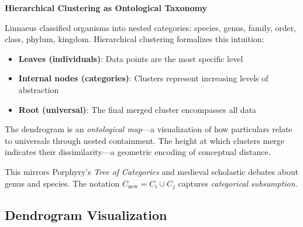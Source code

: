 \begin{philobox}
\textbf{Hierarchical Clustering as Ontological Taxonomy}

Linnaeus classified organisms into nested categories: species, genus, family, order, class, phylum, kingdom. Hierarchical clustering formalizes this intuition:

\begin{itemize}
    \item \textbf{Leaves (individuals)}: Data points are the most specific level
    \item \textbf{Internal nodes (categories)}: Clusters represent increasing levels of abstraction
    \item \textbf{Root (universal)}: The final merged cluster encompasses all data
\end{itemize}

The dendrogram is an \textit{ontological map}---a visualization of how particulars relate to universals through nested containment. The height at which clusters merge indicates their dissimilarity---a geometric encoding of conceptual distance.

This mirrors Porphyry's \textit{Tree of Categories} and medieval scholastic debates about genus and species. The notation $C_{\text{new}} = C_i \cup C_j$ captures \textit{categorical subsumption}.
\end{philobox}

\subsection{Dendrogram Visualization}

